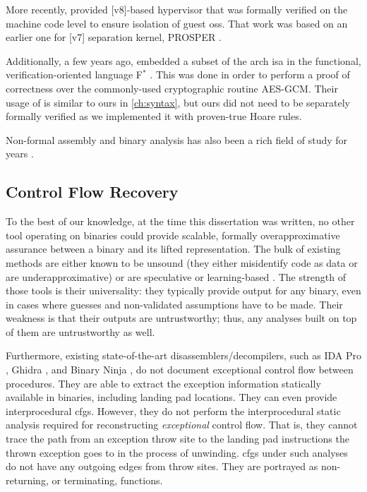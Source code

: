 More recently, \textcite{baumann2016high} provided [v8]-based hypervisor that was formally verified on the machine code level to ensure isolation of guest \acp{os}.
That work was based on an earlier one for [v7] separation kernel, PROSPER \autocite{dam2013hypervisor,dam2013formal}.

Additionally, a few years ago, \textcite{fromherz2019verified} embedded a subset of the \gls{arch} \ac{isa} in the functional, verification-oriented language F$^*$ \autocite{fstar}.
This was done in order to perform a proof of correctness over the commonly-used cryptographic routine AES-GCM.
Their usage of  is similar to ours in \cref{ch:syntax}, but ours did not need to be separately formally verified as we implemented it with proven-true Hoare rules.

Non-formal assembly and binary analysis has also been a rich field of study for years \autocite{kruegel2005automating,brumley2011bap,wang2017angr}.

\subsection{Control Flow Recovery}
To the best of our knowledge, at the time this dissertation was written, no other tool operating on binaries could provide scalable, formally overapproximative assurance between a binary and its lifted representation.
The bulk of existing methods are either known to be unsound (they either misidentify code as data or are underapproximative) \autocite{schwartz2002disassembly} or are speculative or learning-based \autocite{wartell2011differentiating,khadra2016speculative}.
The strength of those tools is their universality: they typically provide output for any binary, even in cases where guesses and non-validated assumptions have to be made.
Their weakness is that their outputs are untrustworthy; thus, any analyses built on top of them are untrustworthy as well.

Furthermore, existing state-of-the-art disassemblers/decompilers, such as IDA Pro \autocite{ida}, Ghidra \autocite{ghidra}, and Binary Ninja \autocite{binary-ninja}, do not document exceptional control flow between procedures.
They are able to extract the exception information statically available in binaries, including landing pad locations.
They can even provide interprocedural \acp{cfg}.
However, they do not perform the interprocedural static analysis required for reconstructing \emph{exceptional} control flow.
That is, they cannot trace the path from an exception throw site to the landing pad instructions the thrown exception goes to in the process of unwinding.
\Acp{cfg} under such analyses do not have any outgoing edges from throw sites.
They are portrayed as non-returning, or terminating, functions.

